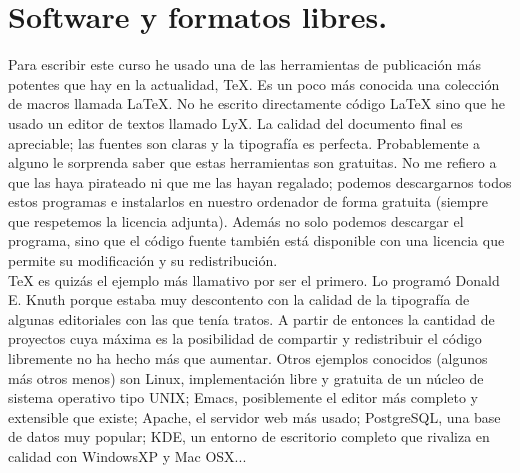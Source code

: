 \chapter{Software y formatos libres.}

Para escribir este curso he usado una de las herramientas de
publicación más potentes que hay en la actualidad, \TeX{}. Es un poco
más conocida una colección de macros llamada \LaTeX{}. No he escrito
directamente código \LaTeX{} sino que he usado un editor de textos
llamado LyX.  La calidad del documento final es apreciable; las
fuentes son claras y la tipografía es perfecta. Probablemente a alguno
le sorprenda saber que estas herramientas son gratuitas. No me refiero
a que las haya pirateado ni que me las hayan regalado; podemos
descargarnos todos estos programas e instalarlos en nuestro ordenador
de forma gratuita (siempre que respetemos la licencia adjunta). Además
no solo podemos descargar el programa, sino que el código fuente
también está disponible
con una licencia que permite su modificación y su redistribución.\\


\TeX{} es quizás el ejemplo más llamativo por ser el primero. Lo
programó Donald E. Knuth porque estaba muy descontento con la calidad
de la tipografía de algunas editoriales con las que tenía tratos. A
partir de entonces la cantidad de proyectos cuya máxima es la
posibilidad de compartir y redistribuir el código libremente no ha
hecho más que aumentar.  Otros ejemplos conocidos (algunos más otros
menos) son Linux, implementación libre y gratuita de un núcleo de
sistema operativo tipo UNIX; Emacs, posiblemente el editor más
completo y extensible que existe; Apache, el servidor web más usado;
PostgreSQL, una base de datos muy popular; KDE, un entorno de
escritorio completo que rivaliza en calidad con WindowsXP
y Mac OSX...\\


